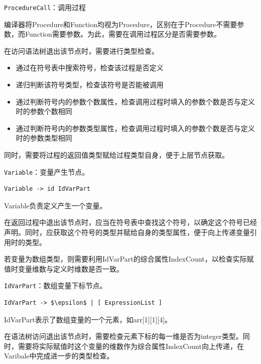 \documentclass[../main.tex]{subfiles}
\begin{document}
\texttt{ProcedureCall}：调用过程

编译器将Procedure和Function均视为Procedure，区别在于Procedure不需要参数，而Function需要参数。为此，需要在调用过程区分是否需要参数。

在访问语法树退出该节点时，需要进行类型检查。

\begin{itemize}
    \item 通过在符号表中搜索符号，检查该过程是否定义
    \item 递归判断该符号类型，检查该符号是否能被调用
    \item 通过判断符号内的参数个数属性，检查调用过程时填入的参数个数是否与定义时的参数个数相同
    \item 通过判断符号内的参数类型属性，检查调用过程时填入的参数个数是否与定义时的参数类型相同    
\end{itemize}

同时，需要将过程的返回值类型赋给过程类型自身，便于上层节点获取。

\texttt{Variable}：变量产生节点。

\begin{lstlisting}[style=grammar]
Variable -> id IdVarPart
\end{lstlisting}

Variable负责定义产生一个变量。

在返回过程中退出该节点时，应当在符号表中查找这个符号，以确定这个符号已经声明。同时，应获取这个符号的类型并赋给自身的类型属性，便于向上传递变量引用时的类型。

若变量为数组类型，则需要利用IdVarPart的综合属性IndexCount，以检查实际赋值时变量维数与定义时维数是否一致。

\texttt{IdVarPart}：数组变量下标节点。

\begin{lstlisting}[style=grammar]
IdVarPart -> $\epsilon$ | [ ExpressionList ]
\end{lstlisting}

IdVarPart表示了数组变量的一个元素，如arr[1][1][4]。

在语法树访问退出该节点时，需要检查元素下标的每一维是否为integer类型。同时，需要将实际赋值时这个变量的维数作为综合属性IndexCount向上传递，在Varibale中完成进一步的类型检查。
\end{document}
